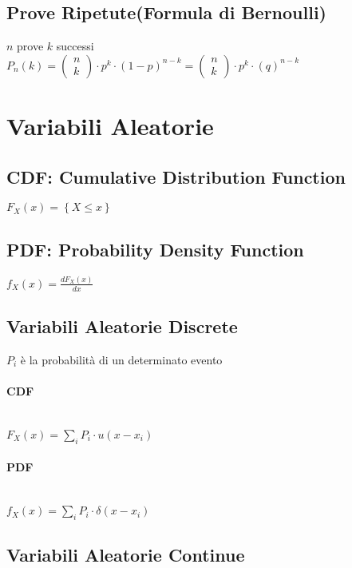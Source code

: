 \documentclass{article}
\begin{document}
\subsection{Prove Ripetute(Formula di Bernoulli)}
$n$ prove $k$ successi \\
$P_n(k) = \left( \begin{matrix} n \\ k \end{matrix}\right) \cdot p^k\cdot (1-p)^{n-k} = \left( \begin{matrix} n \\ k \end{matrix}\right) \cdot p^k\cdot (q)^{n-k}$

\section{Variabili Aleatorie}

\subsection{CDF: Cumulative Distribution Function}
$F_X(x) = \left\{ X \leq x\right\}$

\subsection{PDF: Probability Density Function}
$f_X(x) = \frac{dF_X(x)}{dx}$

\subsection{Variabili Aleatorie Discrete}

$P_i$ è la probabilità di un determinato evento
\paragraph{CDF} ~\\
$F_X(x) = \sum_{i} P_i \cdot u(x - x_i)$

\paragraph{PDF} ~\\
$f_X(x) = \sum_{i} P_i \cdot \delta(x - x_i)$

\subsection{Variabili Aleatorie Continue}
\end{document}
